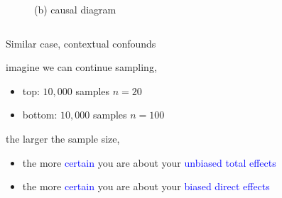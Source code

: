 \begin{frame}
\begin{columns}
\begin{column}{0.5\textwidth}
\begin{figure}
				\caption*{(b) causal diagram}
			\end{figure}
		\end{column}
	\end{columns}
\end{frame}
%
%
\begin{lhframe}[rhgraphic={\texttt{[image: pipefork2b\_samplesize.pdf]}}]
	{Similar case, contextual confounds}
	
	imagine we can continue sampling,
	\begin{itemize}
		\item top: $10,000$ samples $n=20$
		\item bottom: $10,000$ samples $n=100$
	\end{itemize}
	
	the larger the sample size,
	\begin{itemize}
		\item the more \textcolor{blue}{certain} you are about your \textcolor{blue}{unbiased total effects}
		\item the more \textcolor{blue}{certain} you are about your \textcolor{blue}{biased direct effects}
	\end{itemize}
\end{lhframe}
%
%
